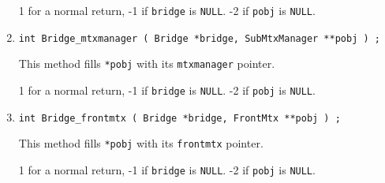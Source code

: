 \begin{enumerate}
1 for a normal return, 
-1 if \texttt{bridge} is \texttt{NULL}.
-2 if \texttt{pobj} is \texttt{NULL}.
\item
\begin{verbatim}
int Bridge_mtxmanager ( Bridge *bridge, SubMtxManager **pobj ) ;
\end{verbatim}
This method fills \texttt{*pobj} with its \texttt{mtxmanager} pointer.
\par {}
1 for a normal return, 
-1 if \texttt{bridge} is \texttt{NULL}.
-2 if \texttt{pobj} is \texttt{NULL}.
\item
\begin{verbatim}
int Bridge_frontmtx ( Bridge *bridge, FrontMtx **pobj ) ;
\end{verbatim}
This method fills \texttt{*pobj} with its \texttt{frontmtx} pointer.
\par {}
1 for a normal return, 
-1 if \texttt{bridge} is \texttt{NULL}.
-2 if \texttt{pobj} is \texttt{NULL}.
\end{enumerate}
\par
